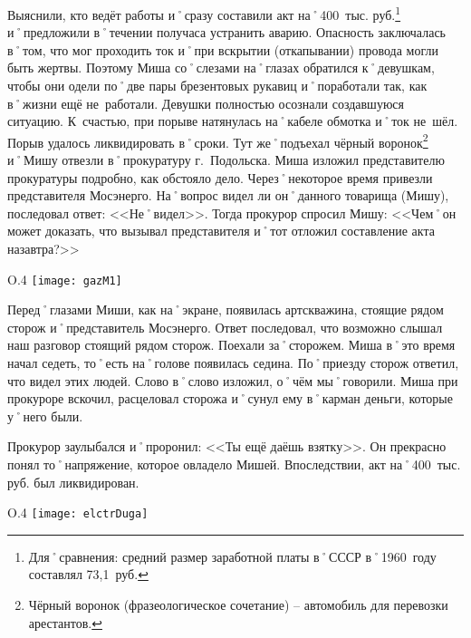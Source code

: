 Выяснили, кто ведёт работы и˚сразу составили акт на˚400~тыс. руб.\footnote{Для˚сравнения: средний размер заработной платы в˚СССР в˚1960~году составлял 73,1~руб.} и˚предложили в˚течении получаса устранить аварию. Опасность заключалась в˚том, что мог проходить ток и˚при вскрытии (откапывании) провода могли быть жертвы. Поэтому Миша со˚слезами на˚глазах обратился к˚девушкам, чтобы они одели по˚две пары брезентовых рукавиц и˚поработали так, как в˚жизни ещё не~работали. Девушки полностью осознали создавшуюся ситуацию. К~счастью, при порыве натянулась на˚кабеле обмотка и˚ток не~шёл. Порыв удалось ликвидировать в˚сроки. Тут же˚подъехал чёрный воронок\footnote{Чёрный воронок (фразеологическое сочетание) \--- автомобиль для перевозки арестантов.} и˚Мишу отвезли в˚прокуратуру г.~Подольска. Миша изложил представителю прокуратуры подробно, как обстояло дело. Через˚некоторое время привезли представителя Мосэнерго. На˚вопрос видел ли он˚данного товарища (Мишу), последовал ответ: <<Не˚видел>>. Тогда прокурор спросил Мишу: <<Чем˚он может доказать, что вызывал представителя и˚тот отложил составление акта назавтра?>>

\begin{wrapfigure}{O}{.4\textwidth}
\centering
\texttt{[image: gazM1]}
\caption[Чёрный воронок. Автомобиль ГАЗ-М\=/1 в˚Музее отечественной военной истории.]{Чёрный воронок. Автомобиль ГАЗ-М\=/1 в˚Музее отечественной военной истории\footnotemark.}
\label{fig:gazM1}
\end{wrapfigure}

Перед˚глазами Миши, как на˚экране, появилась артскважина, стоящие рядом сторож и˚представитель Мосэнерго. Ответ последовал, что возможно слышал наш разговор стоящий рядом сторож. Поехали за˚сторожем. Миша в˚это время начал седеть, то˚есть на˚голове появилась седина. По˚приезду сторож ответил, что видел этих людей. Слово в˚слово изложил, о˚чём мы˚говорили. Миша при прокуроре вскочил, расцеловал сторожа и˚сунул ему в˚карман деньги, которые у˚него были.

Прокурор заулыбался и˚проронил: <<Ты ещё даёшь взятку>>. Он прекрасно понял то˚напряжение, которое овладело Мишей. Впоследствии, акт на˚400~тыс. руб. был ликвидирован.

\begin{wrapfigure}{O}{.4\textwidth}
\centering
\texttt{[image: elctrDuga]}
\caption{Вольтова (электрическая) дуга.}
\label{fig:elctrDuga}
\end{wrapfigure}

